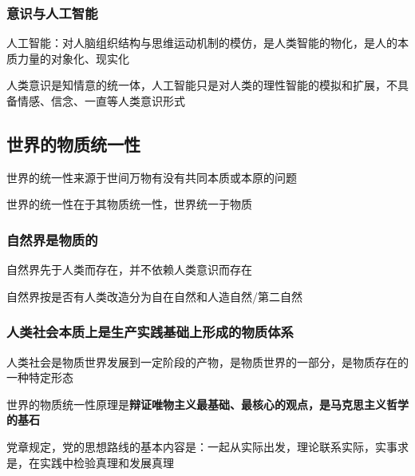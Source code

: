 \subsubsection*{意识与人工智能}%
\label{subsub:意识与人工智能}
\begin{defi}
    人工智能：对人脑组织结构与思维运动机制的模仿，是人类智能的物化，是人的本质力量的对象化、现实化
\end{defi}
人类意识是知情意的统一体，人工智能只是对人类的理性智能的模拟和扩展，不具备情感、信念、一直等人类意识形式
\subsection{世界的物质统一性}%
\label{sub:世界的物质统一性}
世界的统一性来源于世间万物有没有共同本质或本原的问题

世界的统一性在于其物质统一性，世界统一于物质
\subsubsection*{自然界是物质的}%
\label{subsub:自然界是物质的}
自然界先于人类而存在，并不依赖人类意识而存在

自然界按是否有人类改造分为自在自然和人造自然/第二自然
\subsubsection*{人类社会本质上是生产实践基础上形成的物质体系}%
\label{subsub:人类社会本质上是生产实践基础上形成的物质体系}
人类社会是物质世界发展到一定阶段的产物，是物质世界的一部分，是物质存在的一种特定形态

世界的物质统一性原理是\textbf{辩证唯物主义最基础、最核心的观点，是马克思主义哲学的基石}
\begin{notation}
    党章规定，党的思想路线的基本内容是：一起从实际出发，理论联系实际，实事求是，在实践中检验真理和发展真理
\end{notation}

